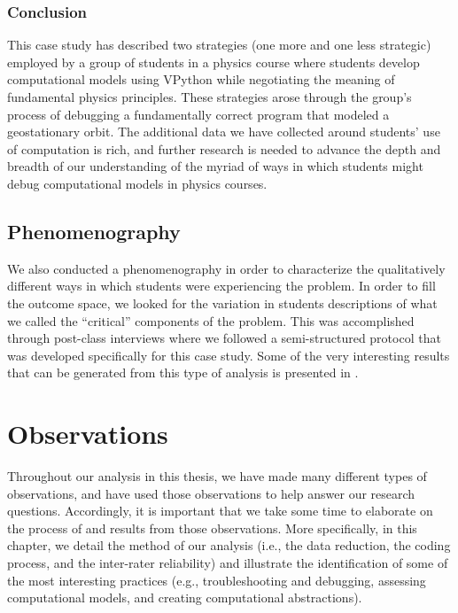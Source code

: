 \documentclass{msuphddissertation}
\begin{document}
\begin{doublespace}
\subsection{Conclusion}

This case study has described two strategies (one more and one less strategic) employed by a group of students in a physics course where students develop computational models using VPython while negotiating the meaning of fundamental physics principles. These strategies arose through the group's process of debugging a fundamentally correct program that modeled a geostationary orbit. The additional data we have collected around students' use of computation is rich, and further research is needed to advance the depth and breadth of our understanding of the myriad of ways in which students might debug computational models in physics courses.

\section{Phenomenography}\label{Sec:Phenom}

We also conducted a phenomenography in order to characterize the qualitatively different ways in which students were experiencing the problem.  In order to fill the outcome space, we looked for the variation in students descriptions of what we called the ``critical'' components of the problem.  This was accomplished through post-class interviews where we followed a semi-structured protocol that was developed specifically for this case study.  Some of the very interesting results that can be generated from this type of analysis is presented in \cite{Hawkins2017}.

%
%
%
%
%
%
%
%
%
%
%
%
%
%
%
%

\chapter{Observations}\label{CH5:Observations}

Throughout our analysis in this thesis, we have made many different types of observations, and have used those observations to help answer our research questions.  Accordingly, it is important that we take some time to elaborate on the process of and results from those observations.  More specifically, in this chapter, we detail the method of our analysis (i.e., the data reduction, the coding process, and the inter-rater reliability) and illustrate the identification of some of the most interesting practices (e.g., troubleshooting and debugging, assessing computational models, and creating computational abstractions).


\end{doublespace}
\end{document}
